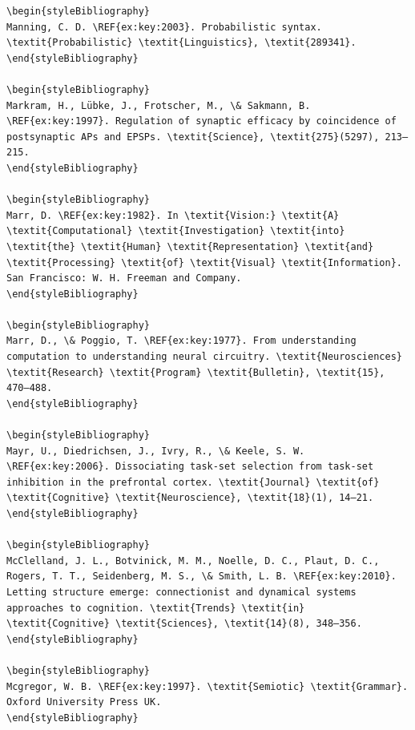 \begin{verbatim}
\begin{styleBibliography}
Manning, C. D. \REF{ex:key:2003}. Probabilistic syntax. \textit{Probabilistic} \textit{Linguistics}, \textit{289341}.
\end{styleBibliography}

\begin{styleBibliography}
Markram, H., Lübke, J., Frotscher, M., \& Sakmann, B. \REF{ex:key:1997}. Regulation of synaptic efficacy by coincidence of postsynaptic APs and EPSPs. \textit{Science}, \textit{275}(5297), 213–215.
\end{styleBibliography}

\begin{styleBibliography}
Marr, D. \REF{ex:key:1982}. In \textit{Vision:} \textit{A} \textit{Computational} \textit{Investigation} \textit{into} \textit{the} \textit{Human} \textit{Representation} \textit{and} \textit{Processing} \textit{of} \textit{Visual} \textit{Information}. San Francisco: W. H. Freeman and Company.
\end{styleBibliography}

\begin{styleBibliography}
Marr, D., \& Poggio, T. \REF{ex:key:1977}. From understanding computation to understanding neural circuitry. \textit{Neurosciences} \textit{Research} \textit{Program} \textit{Bulletin}, \textit{15}, 470–488.
\end{styleBibliography}

\begin{styleBibliography}
Mayr, U., Diedrichsen, J., Ivry, R., \& Keele, S. W. \REF{ex:key:2006}. Dissociating task-set selection from task-set inhibition in the prefrontal cortex. \textit{Journal} \textit{of} \textit{Cognitive} \textit{Neuroscience}, \textit{18}(1), 14–21.
\end{styleBibliography}

\begin{styleBibliography}
McClelland, J. L., Botvinick, M. M., Noelle, D. C., Plaut, D. C., Rogers, T. T., Seidenberg, M. S., \& Smith, L. B. \REF{ex:key:2010}. Letting structure emerge: connectionist and dynamical systems approaches to cognition. \textit{Trends} \textit{in} \textit{Cognitive} \textit{Sciences}, \textit{14}(8), 348–356.
\end{styleBibliography}

\begin{styleBibliography}
Mcgregor, W. B. \REF{ex:key:1997}. \textit{Semiotic} \textit{Grammar}. Oxford University Press UK.
\end{styleBibliography}


\end{verbatim}
